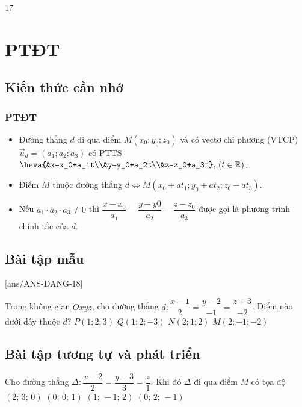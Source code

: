 \setcounter {section} {17}
\setcounter{ex}{0}
\section{PTĐT}
\subsection{Kiến thức cần nhớ}
\begin{khung}
	\subsubsection{PTĐT}
	\begin{itemize}
		\item Đường thẳng $d$ đi qua điểm $M(x_0;y_0;z_0)$ và có vectơ chỉ phương (VTCP) $\vec{u}_d=(a_1;a_2;a_3)$ có PTTS $\heva{&x=x_0+a_1t\\&y=y_0+a_2t\\&z=z_0+a_3t},\, ( t\in \mathbb{R})$.
		\item Điểm $M$ thuộc đường thẳng $d\Leftrightarrow M(x_0+at_1;y_0+at_2;z_0+at_3)$.
		\item Nếu $a_1\cdot a_2\cdot a_3 \ne 0$ thì $\dfrac{x-x_0}{a_1}=\dfrac{y-y0}{a_2}=\dfrac{z-z_0}{a_3}$ được gọi là phương trình chính tắc của $d$. 
	\end{itemize}
\end{khung}
\subsection{Bài tập mẫu}
[ans/ANS-DANG-18]
\begin{khung}
	\begin{vd}%
		Trong không gian $O x y z$, cho đường thẳng $d: \dfrac{x-1}{2}=\dfrac{y-2}{-1}=\dfrac{z+3}{-2}$. Điểm nào dưới đây thuộc $d$?
		\choice
		{$P(1; 2; 3)$}
		{\True $Q(1; 2;-3)$}
		{$N(2; 1; 2)$}
		{$M(2;-1;-2)$}
	\end{vd}
\end{khung}
\subsection{Bài tập tương tự và phát triển}
\begin{ex}%
	Cho đường thẳng $\Delta\colon\dfrac{x-2}{2}=\dfrac{y-3}{3}=\dfrac{z}{1}$. Khi đó $\Delta $ đi qua điểm $ M$ có tọa độ
	\choice
	{\True $\left(2;\,3;\,0\right)$}
	{$\left(0;\,0;\,1\right)$}
	{$\left(1;\,-1;\,2\right)$}
	{$\left(0;\,2;\,-1\right)$}
\end{ex}


